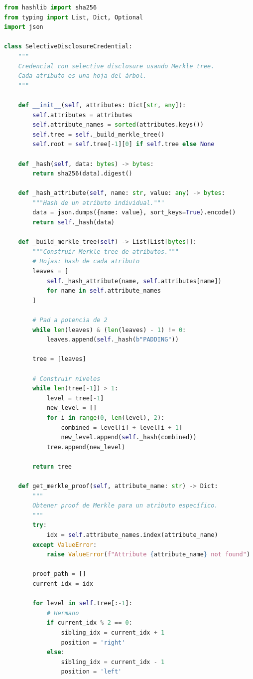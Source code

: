 \documentclass[11pt,a4paper,twoside]{book}
\theoremstyle{definition}
\theoremstyle{remark}
\begin{document}
\begin{lstlisting}[language=Python, caption={Selective disclosure con estructura Merkle}]
from hashlib import sha256
from typing import List, Dict, Optional
import json

class SelectiveDisclosureCredential:
    """
    Credencial con selective disclosure usando Merkle tree.
    Cada atributo es una hoja del árbol.
    """
    
    def __init__(self, attributes: Dict[str, any]):
        self.attributes = attributes
        self.attribute_names = sorted(attributes.keys())
        self.tree = self._build_merkle_tree()
        self.root = self.tree[-1][0] if self.tree else None
    
    def _hash(self, data: bytes) -> bytes:
        return sha256(data).digest()
    
    def _hash_attribute(self, name: str, value: any) -> bytes:
        """Hash de un atributo individual."""
        data = json.dumps({name: value}, sort_keys=True).encode()
        return self._hash(data)
    
    def _build_merkle_tree(self) -> List[List[bytes]]:
        """Construir Merkle tree de atributos."""
        # Hojas: hash de cada atributo
        leaves = [
            self._hash_attribute(name, self.attributes[name])
            for name in self.attribute_names
        ]
        
        # Pad a potencia de 2
        while len(leaves) & (len(leaves) - 1) != 0:
            leaves.append(self._hash(b"PADDING"))
        
        tree = [leaves]
        
        # Construir niveles
        while len(tree[-1]) > 1:
            level = tree[-1]
            new_level = []
            for i in range(0, len(level), 2):
                combined = level[i] + level[i + 1]
                new_level.append(self._hash(combined))
            tree.append(new_level)
        
        return tree
    
    def get_merkle_proof(self, attribute_name: str) -> Dict:
        """
        Obtener proof de Merkle para un atributo específico.
        """
        try:
            idx = self.attribute_names.index(attribute_name)
        except ValueError:
            raise ValueError(f"Attribute {attribute_name} not found")
        
        proof_path = []
        current_idx = idx
        
        for level in self.tree[:-1]:
            # Hermano
            if current_idx % 2 == 0:
                sibling_idx = current_idx + 1
                position = 'right'
            else:
                sibling_idx = current_idx - 1
                position = 'left'
            

\end{lstlisting}
\end{document}
